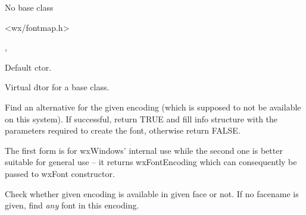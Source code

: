 
No base class


<wx/fontmap.h>


, 


\label{wxfontmapperwxfontmapper}


Default ctor.

\label{wxfontmapperdtor}


Virtual dtor for a base class.

\label{wxfontmappergetaltforencoding}



Find an alternative for the given encoding (which is supposed to not be
available on this system). If successful, return TRUE and fill info
structure with the parameters required to create the font, otherwise
return FALSE.

The first form is for wxWindows' internal use while the second one
is better suitable for general use -- it returns wxFontEncoding which
can consequently be passed to wxFont constructor.

\label{wxfontmapperisencodingavailable}


Check whether given encoding is available in given face or not.
If no facename is given, find {\it any} font in this encoding.


